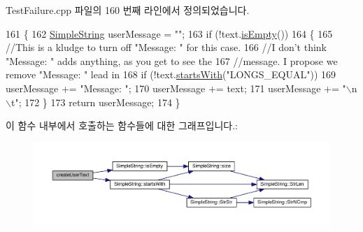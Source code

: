 Test\+Failure.\+cpp 파일의 160 번째 라인에서 정의되었습니다.


\begin{DoxyCode}
161 \{
162     \hyperlink{class_simple_string}{SimpleString} userMessage = \textcolor{stringliteral}{""};
163     \textcolor{keywordflow}{if} (!text.\hyperlink{class_simple_string_a479432127ee77145cc19d6a2d1590821}{isEmpty}())
164     \{
165         \textcolor{comment}{//This is a kludge to turn off "Message: " for this case.}
166         \textcolor{comment}{//I don't think "Message: " adds anything, as you get to see the}
167         \textcolor{comment}{//message. I propose we remove "Message: " lead in}
168         \textcolor{keywordflow}{if} (!text.\hyperlink{class_simple_string_a3baf65fdd925caecc7dfd8f23ff654c3}{startsWith}(\textcolor{stringliteral}{"LONGS\_EQUAL"}))
169             userMessage += \textcolor{stringliteral}{"Message: "};
170         userMessage += text;
171         userMessage += \textcolor{stringliteral}{"\(\backslash\)n\(\backslash\)t"};
172     \}
173     \textcolor{keywordflow}{return} userMessage;
174 \}
\end{DoxyCode}


이 함수 내부에서 호출하는 함수들에 대한 그래프입니다.\+:
\nopagebreak
\begin{figure}[H]
\begin{center}
\leavevmode
\includegraphics[width=350pt]{class_test_failure_ae67765ada519d8a163922f50099a0016_cgraph}
\end{center}
\end{figure}




